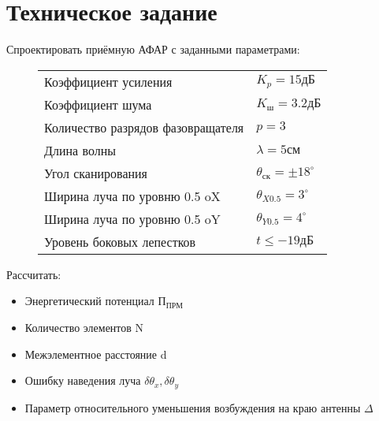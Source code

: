 \chapter{Техническое задание}

Спроектировать приёмную АФАР с заданными параметрами:

\begin{figure}[!h]
	\begin{tabularx}{1.5\textwidth}{>{\raggedright\arraybackslash}X >{\raggedright\arraybackslash}X}
		Коэффициент усиления 				\dotfill & $K_p=15 \text{дБ}$\\
		Коэффициент шума 					\dotfill & $K_\text{ш}=3.2 \text{дБ}$\\
		Количество разрядов фазовращателя  	\dotfill & $p=3 $\\
		Длина волны							\dotfill & $\lambda=5 \text{см}$\\
		Угол сканирования					\dotfill & $\theta_\text{ск}= \pm18^\circ$\\
		Ширина луча по уровню 0.5 oX		\dotfill & $\theta_{X0.5}=3^\circ$\\
		Ширина луча по уровню 0.5 oY		\dotfill & $\theta_{Y0.5}=4^\circ$\\
		Уровень боковых лепестков			\dotfill & $t\leq-19 \text{дБ}$
	\end{tabularx}
\end{figure}

Рассчитать:

\begin{itemize}
	\item Энергетический потенциал $\text{П}_\text{ПРМ}$
	\item Количество элементов N
	\item Межэлементное расстояние d
	\item Ошибку наведения луча $\delta\theta_x, \delta\theta_y$
	\item Параметр относительного уменьшения возбуждения на краю антенны $\Delta$
\end{itemize}